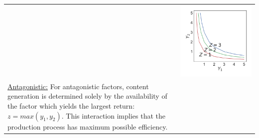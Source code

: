 \begin{table}[h!]
\begin{tabular}{m{}c}
    &
    \begin{minipage}{.17\textwidth}
      \includegraphics[width=\textwidth, height=.975\textwidth]{Figures/Interactive_Essential.pdf}
    \end{minipage}
    \\
    \vspace{-10pt}
    \uline{Antagonistic:} For antagonistic factors, content generation is determined solely by the availability of the factor which yields the largest return: $z = max(y_1, y_2)$. This interaction implies that the production process has maximum possible efficiency. 
    &
    \begin{minipage}{.17\textwidth}

\end{minipage}
\end{tabular}
\end{table}
